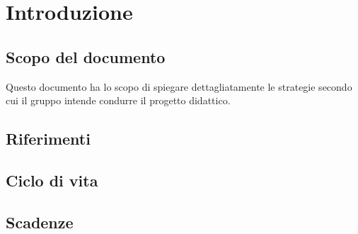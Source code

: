 \section{Introduzione}
	\subsection{Scopo del documento} 
	Questo documento ha lo scopo di spiegare dettagliatamente le strategie secondo cui il gruppo  intende condurre il progetto didattico.
	\subsection{Riferimenti}
	\subsection{Ciclo di vita}
	\subsection{Scadenze}
	